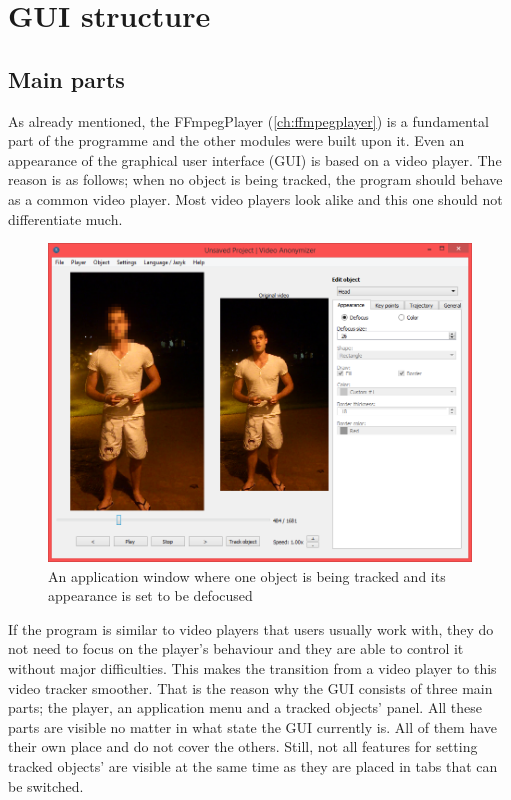 \section{GUI structure}
\subsection{Main parts}
As already mentioned, the FFmpegPlayer (\autoref{ch:ffmpegplayer}) is a fundamental part of the programme and the other modules were built upon it. Even an appearance of the graphical user interface (GUI) is based on a video player. The reason is as follows; when no object is being tracked, the program should behave as a common video player. Most video players look alike and this one should not differentiate much.
\begin{figure}[!htbp]
\centering
\includegraphics[width=\textwidth]{png/all_defocus}
\caption{An application window where one object is being tracked and its appearance is set to be defocused}
\label{fig:all_defocus}
\end{figure}
If the program is similar to video players that users usually work with, they do not need to focus on the player’s behaviour and they are able to control it without major difficulties. This makes the transition from a video player to this video tracker smoother. That is the reason why the GUI consists of three main parts; the player, an application menu and a tracked objects’ panel. All these parts are visible no matter in what state the GUI currently is. All of them have their own place and do not cover the others. Still, not all features for setting tracked objects’ are visible at the same time as they are placed in tabs that can be switched.

